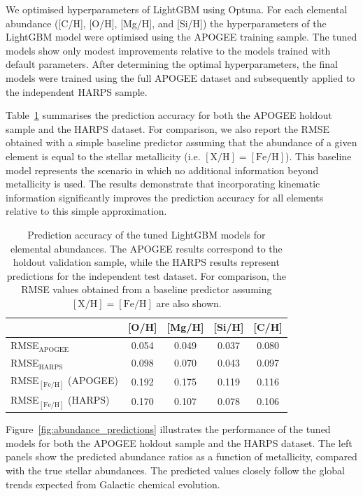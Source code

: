 \documentclass{aa}
\begin{document}
We optimised hyperparameters of LightGBM using Optuna. For each elemental abundance ([C/H], [O/H], [Mg/H], and [Si/H]) the hyperparameters of the LightGBM model were optimised using the APOGEE training sample. The tuned models show only modest improvements relative to the models trained with default parameters. After determining the optimal hyperparameters, the final models were trained using the full APOGEE dataset and subsequently applied to the independent HARPS sample.

Table~\ref{tab:abundance_predictions} summarises the prediction accuracy for both the APOGEE holdout sample and the HARPS dataset. For comparison, we also report the RMSE obtained with a simple baseline predictor assuming that the abundance of a given element is equal to the stellar metallicity (i.e. $\mathrm{[X/H]} = \mathrm{[Fe/H]}$). This baseline model represents the scenario in which no additional information beyond metallicity is used. The results demonstrate that incorporating kinematic information significantly improves the prediction accuracy for all elements relative to this simple approximation.

\begin{table}
\caption{Prediction accuracy of the tuned LightGBM models for elemental abundances.
The APOGEE results correspond to the holdout validation sample, while the HARPS
results represent predictions for the independent test dataset. For comparison,
the RMSE values obtained from a baseline predictor assuming
$\mathrm{[X/H]}=\mathrm{[Fe/H]}$ are also shown.}
\centering
\begin{tabular}{lcccc}
\hline
 & [O/H] & [Mg/H] & [Si/H] & [C/H] \\
\hline
RMSE$_{\mathrm{APOGEE}}$ & 0.054 & 0.049 & 0.037 & 0.080 \\
RMSE$_{\mathrm{HARPS}}$  & 0.098 & 0.070 & 0.043 & 0.097 \\
\hline
RMSE$_{\mathrm{[Fe/H]}}$ (APOGEE) & 0.192 & 0.175 & 0.119 & 0.116 \\
RMSE$_{\mathrm{[Fe/H]}}$ (HARPS)  & 0.170 & 0.107 & 0.078 & 0.106 \\
\hline
\end{tabular}
\label{tab:abundance_predictions}
\end{table}

Figure~\ref{fig:abundance_predictions} illustrates the performance of the tuned models for both the APOGEE holdout sample and the HARPS dataset. The left panels show the predicted abundance ratios as a function of metallicity, compared with the true stellar abundances. The predicted values closely follow the global trends expected from Galactic chemical evolution.
\end{document}
